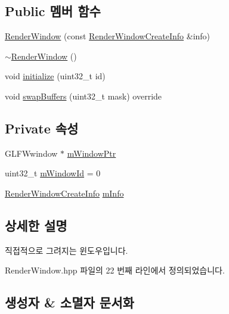 \subsection*{Public 멤버 함수}
\begin{DoxyCompactItemize}
\item 
\hyperlink{classcpf_1_1_render_window_a9421d01e20c4efa5937b6d3bc418c18b}{Render\+Window} (const \hyperlink{structcpf_1_1_render_window_create_info}{Render\+Window\+Create\+Info} \&info)
\item 
\hyperlink{classcpf_1_1_render_window_a1422898fc6458538f6665fa6555ef86c}{$\sim$\+Render\+Window} ()
\item 
void \hyperlink{classcpf_1_1_render_window_a173081ae0a9f72968e8ecf3461c22b3b}{initialize} (uint32\+\_\+t id)
\item 
void \hyperlink{classcpf_1_1_render_window_aebc9f2d43f5802a2affb26a2179312c9}{swap\+Buffers} (uint32\+\_\+t mask) override
\end{DoxyCompactItemize}
\subsection*{Private 속성}
\begin{DoxyCompactItemize}
\item 
G\+L\+F\+Wwindow $\ast$ \hyperlink{classcpf_1_1_render_window_a871b4de6be0b9fa29b9394e38c395a04}{m\+Window\+Ptr}
\item 
uint32\+\_\+t \hyperlink{classcpf_1_1_render_window_af4d30f7fd51910725a814828ea9cc33e}{m\+Window\+Id} = 0
\item 
\hyperlink{structcpf_1_1_render_window_create_info}{Render\+Window\+Create\+Info} \hyperlink{classcpf_1_1_render_window_ad3608b5ed5c1b0c5471f96e5c5199eb0}{m\+Info}
\end{DoxyCompactItemize}


\subsection{상세한 설명}
직접적으로 그려지는 윈도우입니다. 

Render\+Window.\+hpp 파일의 22 번째 라인에서 정의되었습니다.



\subsection{생성자 \& 소멸자 문서화}
\mbox{\label{classcpf_1_1_render_window_a9421d01e20c4efa5937b6d3bc418c18b}} 
